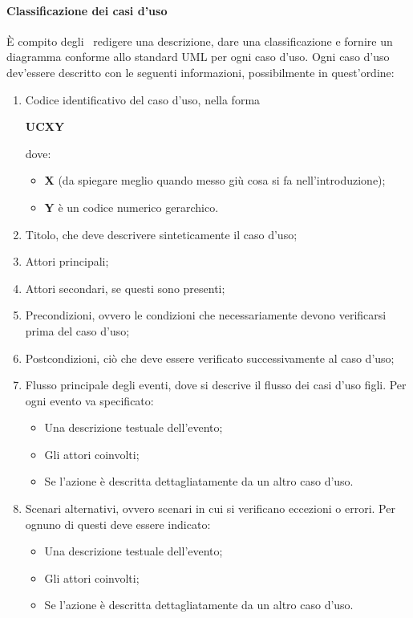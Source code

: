 \documentclass[../NormeProgetto.tex]{subfiles}
\begin{document}
			\paragraph{Classificazione dei casi d'uso}
			È compito degli \analisti\ redigere una descrizione, dare una classificazione e fornire un diagramma conforme allo standard UML per ogni caso d'uso. Ogni caso d'uso dev'essere descritto con le seguenti informazioni, possibilmente in quest'ordine:
			\begin{enumerate}
				\item Codice identificativo del caso d'uso, nella forma \begin{center}\textbf{UCXY}\end{center} dove:
					\begin{itemize}
						\item \textbf{X} (da spiegare meglio quando messo giù cosa si fa nell'introduzione);
						\item \textbf{Y} è un codice numerico gerarchico.
					\end{itemize}
				\item Titolo, che deve descrivere sinteticamente il caso d'uso;
				\item Attori principali;
				\item Attori secondari, se questi sono presenti;
				\item Precondizioni, ovvero le condizioni che necessariamente devono verificarsi prima del caso d'uso;
				\item Postcondizioni, ciò che deve essere verificato successivamente al caso d'uso;
				\item Flusso principale degli eventi, dove si descrive il flusso dei casi d'uso figli. Per ogni evento va specificato:
					\begin{itemize}
						\item Una descrizione testuale dell'evento;
						\item Gli attori coinvolti;
						\item Se l'azione è descritta dettagliatamente da un altro caso d'uso.
					\end{itemize}
				\item Scenari alternativi, ovvero scenari in cui si verificano eccezioni o errori. Per ognuno di questi deve essere indicato:
					\begin{itemize}
						\item Una descrizione testuale dell'evento;
						\item Gli attori coinvolti;
						\item Se l'azione è descritta dettagliatamente da un altro caso d'uso.
					\end{itemize}
			\end{enumerate}
\end{document}
